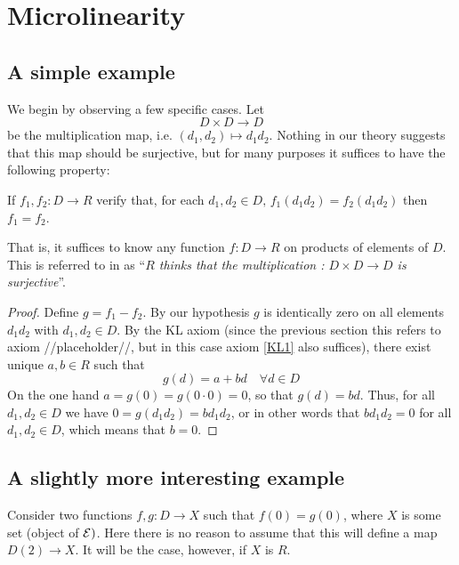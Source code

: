 \section{Microlinearity}

\subsection{A simple example}

We begin by observing a few specific cases. Let
\begin{equation*}
   D\times D \to D 
\end{equation*}
be the multiplication map, i.e. \( (d_1,d_2)\mapsto d_1d_2 \). Nothing in our theory suggests that this map should be surjective, but for many purposes it suffices to have the following property:

\begin{proposition}
  If \( f_1,f_2:D \to R \) verify that, for each \( d_1,d_2\in D,\, f_1(d_1d_2) = f_2(d_1d_2)  \) then \( f_1=f_2 \).
\end{proposition}

That is, it suffices to know any function \( f:D\to R \) on products of elements of \( D \). This is referred to in \cite{kock06} as ``\emph{\( R \) thinks that the multiplication : \( D\times D\to D \) is surjective}''.

\begin{proof}
  Define \( g = f_1-f_2 \). By our hypothesis \( g \) is identically zero on all elements \( d_1d_2 \) with \( d_1,d_2\in D \). By the KL axiom (since the previous section this refers to axiom {//placeholder//}, but in this case axiom \ref{KL1} also suffices), there exist unique \( a,b\in R \) such that
  \begin{equation*}
    g(d)=a + bd\quad \forall d\in D 
  \end{equation*}
  On the one hand \( a=g(0)=g(0\cdot 0) = 0 \), so that \( g(d)=bd \). Thus, for all \( d_1,d_2\in D \) we have \( 0 = g(d_1d_2) = bd_1d_2 \), or in other words that \( bd_1d_2=0 \) for all \( d_1,d_2\in D \), which means that \( b=0 \).
\end{proof}

\subsection{A slightly more interesting example}

Consider two functions \( f,g:D\to X \) such that \( f(0)=g(0) \), where \( X \) is some set (object of \(  \mathcal{E}) \). Here there is no reason to assume that this will define a map \( D(2)\to X \). It will be the case, however, if \( X \) is \( R \).

